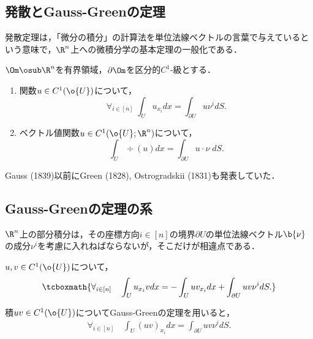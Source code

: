 \documentclass[uplatex,dvipdfmx]{jsreport}
\begin{document}
\subsection{発散とGauss-Greenの定理}

\begin{tcolorbox}[colframe=ForestGreen, colback=ForestGreen!10!white,breakable,colbacktitle=ForestGreen!40!white,coltitle=black,fonttitle=\bfseries\sffamily,
title=]
    発散定理は，「微分の積分」の計算法を単位法線ベクトルの言葉で与えているという意味で，$\R^n$上への微積分学の基本定理の一般化である．
\end{tcolorbox}

\begin{theorem}\label{thm-Gauss-Green}
    $\Om\osub\R^n$を有界領域，$\partial\Om$を区分的$C^1$-級とする．
    \begin{enumerate}
        \item 関数$u\in C^1(\o{U})$について，
        \[\forall_{i\in[n]}\;\int_Uu_{x_i}dx=\int_{\partial U}u\nu^idS.\]
        \item ベクトル値関数$u\in C^1(\o{U};\R^n)$について，
        \[\int_U\div (u)dx=\int_{\partial U}u\cdot \nu\;dS.\]
    \end{enumerate}
\end{theorem}
\begin{history}
    Gauss (1839)以前にGreen (1828), Ostrogradskii (1831)も発表していた．
\end{history}

\subsection{Gauss-Greenの定理の系}

\begin{tcolorbox}[colframe=ForestGreen, colback=ForestGreen!10!white,breakable,colbacktitle=ForestGreen!40!white,coltitle=black,fonttitle=\bfseries\sffamily,
title=]
    $\R^n$上の部分積分は，その座標方向$i\in[n]$の境界$\partial U$の単位法線ベクトル$\b{\nu}$の成分$\nu^i$を考慮に入れねばならないが，そこだけが相違点である．
\end{tcolorbox}

\begin{corollary}[成分毎の部分積分公式]\label{cor-partial-integral}
    $u,v\in C^1(\o{U})$について，
    \[\tcboxmath{\forall_{i\in[n]}\quad\int_Uu_{x_i}vdx=-\int_Uuv_{x_i}dx+\int_{\partial U}uv\nu^idS.}\]
\end{corollary}
\begin{Proof}
    積$uv\in C^1(\o{U})$についてGauss-Greenの定理を用いると，
    \begin{align*}
        \forall_{i\in[n]}\quad\int_U(uv)_{x_i}dx=\int_{\partial U}uv\nu^idS.
    \end{align*}
\end{Proof}
\end{document}
